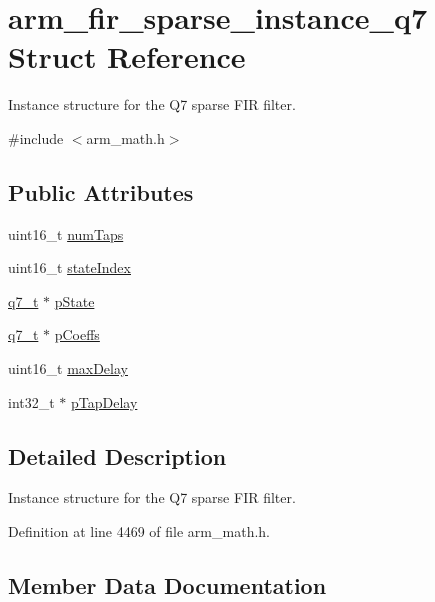 \hypertarget{structarm__fir__sparse__instance__q7}{}\section{arm\+\_\+fir\+\_\+sparse\+\_\+instance\+\_\+q7 Struct Reference}
\label{structarm__fir__sparse__instance__q7}


Instance structure for the Q7 sparse F\+IR filter.  




{\ttfamily \#include $<$arm\+\_\+math.\+h$>$}

\subsection*{Public Attributes}
\begin{DoxyCompactItemize}
\item 
uint16\+\_\+t \hyperlink{structarm__fir__sparse__instance__q7_a54cdd27ca1c672b126c38763ce678b1c}{num\+Taps}
\item 
uint16\+\_\+t \hyperlink{structarm__fir__sparse__instance__q7_a2d2e65473fe3a3f2b953b4e0b60824df}{state\+Index}
\item 
\hyperlink{arm__math_8h_ae541b6f232c305361e9b416fc9eed263}{q7\+\_\+t} $\ast$ \hyperlink{structarm__fir__sparse__instance__q7_a18072cf3ef3666d588f0d49512f2b28f}{p\+State}
\item 
\hyperlink{arm__math_8h_ae541b6f232c305361e9b416fc9eed263}{q7\+\_\+t} $\ast$ \hyperlink{structarm__fir__sparse__instance__q7_a3dac86f15e33553e8f3e19e0d712bae5}{p\+Coeffs}
\item 
uint16\+\_\+t \hyperlink{structarm__fir__sparse__instance__q7_af74dacc1d34c078283e50f2530eb91df}{max\+Delay}
\item 
int32\+\_\+t $\ast$ \hyperlink{structarm__fir__sparse__instance__q7_ac625393c84bc0342ffdf26fc4eba1ac1}{p\+Tap\+Delay}
\end{DoxyCompactItemize}


\subsection{Detailed Description}
Instance structure for the Q7 sparse F\+IR filter. 

Definition at line 4469 of file arm\+\_\+math.\+h.



\subsection{Member Data Documentation}
\mbox{\label{structarm__fir__sparse__instance__q7_af74dacc1d34c078283e50f2530eb91df}} 
